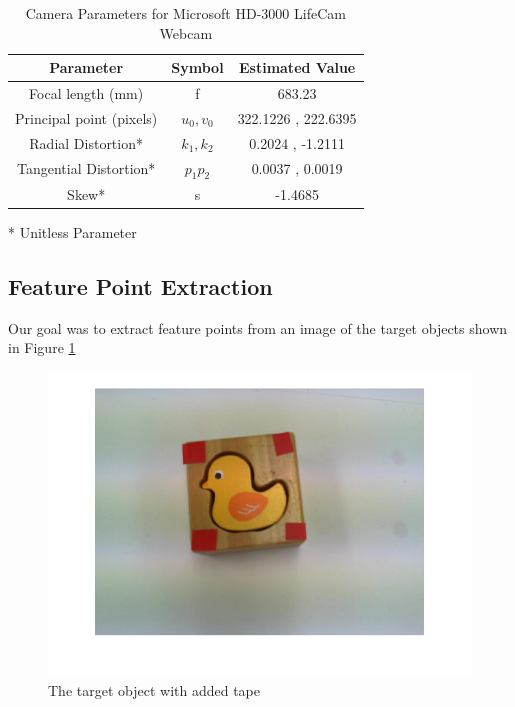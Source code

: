 \documentclass{UoNMCHA}
\numberwithin{equation}{section}
\begin{document}
\begin{table}[H]
	\caption{Camera Parameters for Microsoft HD-3000 LifeCam Webcam}\label{tab:CalculatedCameraParameters}
	\begin{center}
		\begin{tabular}{|c|c|c|}
			\hline
			Parameter 		        & Symbol    & Estimated Value                \\ \hline
			Focal length (mm)         & f         & 683.23               \\
			Principal point (pixels)      & $u_0,v_0$ & 322.1226 , 222.6395  \\
			Radial Distortion*     & $k_1,k_2$     & 0.2024 , -1.2111 \\
			Tangential Distortion* & $p_1 p_2$     & 0.0037 , 0.0019 \\
			Skew*				   & s         &     -1.4685    \\ \hline 
		\end{tabular}
	\end{center}
\hspace{3.5 cm} \vspace{0.25cm} * Unitless Parameter
\end{table}

\subsection{Feature Point Extraction}\label{Feature Point Extraction}

Our goal was to extract feature points from an image of the target objects shown in Figure \ref{fig:tagetobjectworkspace}


\begin{figure}[H]
	\begin{center}
		\includegraphics[width=.7\linewidth]{Figures/targetobjectworkspace}
		\caption{The target object with added tape}
		\label{fig:tagetobjectworkspace}
	\end{center}
\end{figure}
\end{document}
